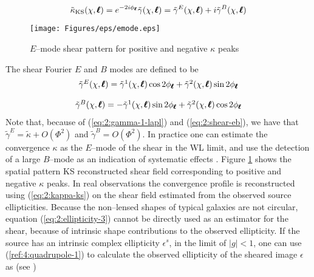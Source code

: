 \begin{equation}
\label{eq:2:kappa-ks}
\tilde{\kappa}_{\rm KS}(\chi,\pmb{\ell}) = e^{-2i\phi_{\pmb{\ell}}} \tilde{\gamma}(\chi,\pmb{\ell}) = \tilde{\gamma}^E(\chi,\pmb{\ell}) + i\tilde{\gamma}^B(\chi,\pmb{\ell})
\end{equation}
%
\begin{figure}
\begin{center}
\texttt{[image: Figures/eps/emode.eps]}
\end{center}
\caption{$E$--mode shear pattern for positive and negative $\kappa$ peaks}
\label{fig:2:emode}
\end{figure}
%
The shear Fourier $E$ and $B$ modes are defined to be 
\begin{equation}
\label{eq:2:shear-eb}
\begin{matrix}
\tilde{\gamma}^E(\chi,\pmb{\ell}) =  \tilde{\gamma}^1(\chi,\pmb{\ell})\cos 2\phi_{\pmb{\ell}} +  \tilde{\gamma}^2(\chi,\pmb{\ell}) \sin 2\phi_{\pmb{\ell}}\\ \\ 
\tilde{\gamma}^B(\chi,\pmb{\ell}) = - \tilde{\gamma}^1(\chi,\pmb{\ell})\sin 2\phi_{\pmb{\ell}} + \tilde{\gamma}^2(\chi,\pmb{\ell}) \cos 2\phi_{\pmb{\ell}}
\end{matrix}
\end{equation}
%
Note that, because of (\ref{eq:2:gamma-1-lapl}) and (\ref{eq:2:shear-eb}), we have that $\tilde{\gamma}^E=\tilde{\kappa}+O(\Phi^2)$ and $\tilde{\gamma}^B=O(\Phi^2)$. In practice one can estimate the convergence $\kappa$ as the $E$--mode of the shear in the WL limit, and use the detection of a large $B$--mode as an indication of systematic effects \citep{PetriSpShear}. Figure \ref{fig:2:emode} shows the spatial pattern KS reconstructed shear field corresponding to positive and negative $\kappa$ peaks. In real observations the convergence profile is reconstructed using (\ref{eq:2:kappa-ks}) on the shear field estimated from the observed source ellipticities. Because the non--lensed shapes of typical galaxies are not circular, equation (\ref{eq:2:ellipticity-3}) cannot be directly used as an estimator for the shear, because of intrinsic shape contributions to the observed ellipticity. If the source has an intrinsic complex ellipticity $\epsilon^s$, in the limit of $\vert g\vert<1$, one can use (\ref{ref:4:quadrupole-1}) to calculate the observed ellipticity of the sheared image $\epsilon$ as (see \citep{RayTracingHartlap})

